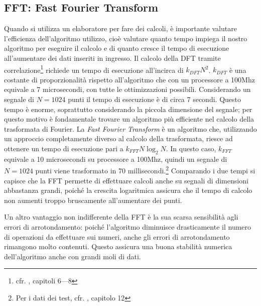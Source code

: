 \subsection{FFT: Fast Fourier Transform}
\label{fft}
Quando si utilizza un elaboratore per fare dei calcoli, \`e importante valutare
l'efficienza dell'algoritmo utilizzo, cio\`e valutare quanto tempo impiega il
nostro algoritmo per eseguire il calcolo e di quanto cresce il tempo di
esecuzione all'aumentare dei dati inseriti in ingresso. Il calcolo della DFT
tramite correlazione\footnote{cfr. \cite{TSEGDSP97}, capitoli 6---8} richiede un
tempo di esecuzione all'incirca di $k_{DFT}N^2$. $k_{DFT}$  \`e una costante di
proporzionalit\`a rispetto all'algoritmo che con un processore a 100Mhz
equivale a 7 microsecondi, con tutte le ottimizzazioni possibili. Considerando un segnale
di $N = 1024$ punti il tempo di esecuzione \`e di circa 7 secondi. Questo tempo
\`e enorme, soprattutto considerando la piccola dimensione del segnale; per
questo motivo \`e fondamentale trovare un algoritmo pi\`u efficiente nel calcolo
della trasformata di Fourier. La \emph{Fast Fourier Transform} \`e un algoritmo
che, utilizzando un approccio completamente diverso al calcolo della
trasformata, riesce ad ottenere un tempo di esecuzione pari a
$k_{FFT}N\log_{2}N$. In questo caso, $k_{FFT}$ equivale a 10 microsecondi su
processore a 100Mhz, quindi un segnale di $N=1024$ punti viene trasformato in 70
millisecondi.\footnote{Per i dati dei test, cfr. \cite{TSEGDSP97}, capitolo 12}
Comparando i due tempi si capisce che la FFT permette di effettuare calcoli
anche su segnali di dimensioni abbastanza grandi, poich\'e la crescita
logaritmica assicura che il tempo di calcolo non aumenti troppo bruscamente
all'aumentare dei punti.

Un altro vantaggio non indifferente della FFT \`e la sua scarsa sensibilit\`a
agli errori di arrotondamento: poich\'e l'algoritmo diminuisce drasticamente il
numero di operazioni da effettuare sui numeri, anche gli errori di
arrotondamento rimangono molto contenuti. Questo assicura una buona stabilit\`a
numerica dell'algoritmo anche con grandi moli di dati.
